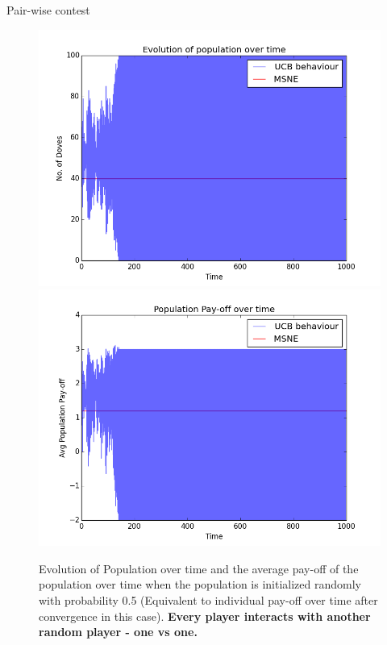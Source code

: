\documentclass{IFES-beamer}
\begin{document}
        \begin{frame}{Pair-wise contest}
            \begin{figure}
                \centering
                \includegraphics[scale=0.25]{Images/UCB/Population/pair_100_1000_epochs.png}
                \includegraphics[scale=0.25]{Images/UCB/Pay-off/pay-off_pair_100_1000_epochs.png}
                \caption{Evolution of Population over time and the average pay-off of the population over time when the population is initialized randomly with probability 0.5 (Equivalent to individual pay-off over time after convergence in this case). \textbf{Every player interacts with another random player - one vs one.}}
                \label{fig:my_label}
            \end{figure}
        \end{frame}
        
\end{document}
